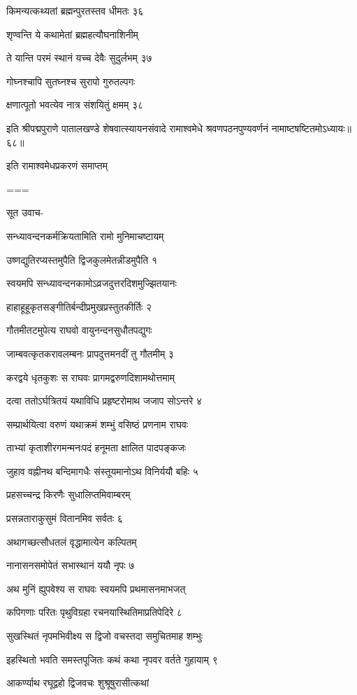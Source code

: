 किमन्यत्कथ्यतां ब्रह्मन्पुरतस्तव धीमतः ३६

शृण्वन्ति ये कथामेतां ब्रह्महत्यौघनाशिनीम्

ते यान्ति परमं स्थानं यच्च देवैः सुदुर्लभम् ३७

गोघ्नश्चापि सुतघ्नश्च सुरापो गुरुतल्पगः

क्षणात्पूतो भवत्येव नात्र संशयितुं क्षमम् ३८

इति श्रीपद्मपुराणे पातालखण्डे शेषवात्स्यायनसंवादे रामाश्वमेधे श्रवणपठनपुण्यवर्णनं नामाष्टषष्टितमोऽध्यायः॥६८॥

इति रामाश्वमेधप्रकरणं समाप्तम्


===





सूत उवाच-

सन्ध्यावन्दनकर्मक्रियतामिति रामो मुनिमाचष्टायम्

उष्णद्युतिरप्यस्तमुपैति द्विजकुलमेतन्नीडमुपैति १

स्वयमपि सन्ध्यावन्दनकामोऽव्रजदुत्तरदिशमुज्झितयानः

हाहाहूहूकृतसङ्गीतिर्बन्दीप्रमुखप्रस्तुतकीर्तिः २

गौतमीतटमुपेत्य राघवो वायुनन्दनसुधौतपद्युगः

जाम्बवत्कृतकरावलम्बनः प्रापदुत्तमनदीं तु गौतमीम् ३

करद्वये धृतकुशः स राघवः प्रागमद्वरुणदिशामथोत्तमाम्

दत्वा ततोऽर्घत्रितयं यथाविधि प्रहृष्टरोमाथ जजाप सोऽन्तरे ४

सम्प्रार्थयित्वा वरुणं यथाक्रमं शम्भुं वसिष्ठं प्रणनाम राघवः

ताभ्यां कृताशीरगमन्मनःपदं हनूमता क्षालित पादपङ्कजः

जुहाव वह्नीनथ बन्दिमागधैः संस्तूयमानोऽथ विनिर्ययौ बहिः ५

प्रहसच्चन्द्र किरणैः सुधालिप्तमिवाम्बरम्

प्रसन्नताराकुसुमं वितानमिव सर्वतः ६

अथागच्छत्सौधतलं वृद्धामात्येन कल्पितम्

नानासनसमोपेतं सभास्थानं ययौ नृपः ७

अथ मुनिं ह्युपवेश्य स राघवः स्वयमपि प्रथमासनमाभजत्

कपिगणाः परितः पृथुविग्रहा रचनयास्थितिमाप्रतिपेदिरे ८

सुखस्थितं नृपमभिवीक्ष्य स द्विजो वचस्तदा समुचितमाह शम्भुः

इहस्थितो भवति समस्तपूजितः कथं कथा नृपवर वर्तते गुहायाम् ९

आकर्ण्याथ रघूद्वहो द्विजवचः शुश्रूषुरासीत्कथां

